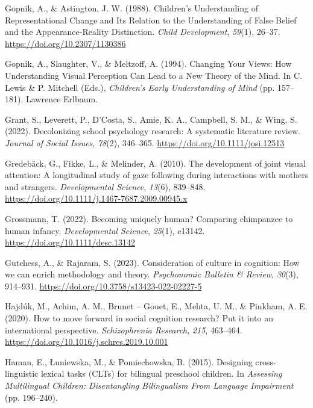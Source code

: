 \documentclass[
]{scrbook}
\newlength{\cslhangindent}
\newenvironment{CSLReferences}[2] %
 {\begin{list}{}{%
  \setlength{\itemindent}{0pt}
  \setlength{\leftmargin}{0pt}
  \setlength{\parsep}{0pt}
  \ifodd #1
   \setlength{\leftmargin}{\cslhangindent}
   \setlength{\itemindent}{-1\cslhangindent}
  \fi
  \setlength{\itemsep}{#2\baselineskip}}}
 {\end{list}}
\begin{document}
\begin{CSLReferences}{1}{0}
Gopnik, A., \& Astington, J. W. (1988). Children's {Understanding} of {Representational Change} and {Its Relation} to the {Understanding} of {False Belief} and the {Appearance-Reality Distinction}. \emph{Child Development}, \emph{59}(1), 26--37. \url{https://doi.org/10.2307/1130386}

Gopnik, A., Slaughter, V., \& Meltzoff, A. (1994). Changing {Your Views}: {How Understanding Visual Perception Can Lead} to a {New Theory} of the {Mind}. In C. Lewis \& P. Mitchell (Eds.), \emph{Children's {Early Understanding} of {Mind}} (pp. 157--181). Lawrence Erlbaum.

Grant, S., Leverett, P., D'Costa, S., Amie, K. A., Campbell, S. M., \& Wing, S. (2022). Decolonizing school psychology research: {A} systematic literature review. \emph{Journal of Social Issues}, \emph{78}(2), 346--365. \url{https://doi.org/10.1111/josi.12513}

Gredebäck, G., Fikke, L., \& Melinder, A. (2010). The development of joint visual attention: A longitudinal study of gaze following during interactions with mothers and strangers. \emph{Developmental Science}, \emph{13}(6), 839--848. \url{https://doi.org/10.1111/j.1467-7687.2009.00945.x}

Grossmann, T. (2022). Becoming uniquely human? {Comparing} chimpanzee to human infancy. \emph{Developmental Science}, \emph{25}(1), e13142. \url{https://doi.org/10.1111/desc.13142}

Gutchess, A., \& Rajaram, S. (2023). Consideration of culture in cognition: {How} we can enrich methodology and theory. \emph{Psychonomic Bulletin \& Review}, \emph{30}(3), 914--931. \url{https://doi.org/10.3758/s13423-022-02227-5}

Hajdúk, M., Achim, A. M., Brunet -- Gouet, E., Mehta, U. M., \& Pinkham, A. E. (2020). How to move forward in social cognition research? {Put} it into an international perspective. \emph{Schizophrenia Research}, \emph{215}, 463--464. \url{https://doi.org/10.1016/j.schres.2019.10.001}

Haman, E., Łuniewska, M., \& Pomiechowska, B. (2015). Designing cross-linguistic lexical tasks ({CLTs}) for bilingual preschool children. In \emph{Assessing {Multilingual Children}: {Disentangling Bilingualism From Language Impairment}} (pp. 196--240).


\end{CSLReferences}
\end{document}

